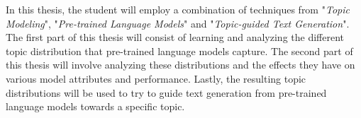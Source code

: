 In this thesis, the student will employ a combination of techniques from "\textit{Topic Modeling}", "\textit{Pre-trained Language Models}" and "\textit{Topic-guided Text Generation}". The first part of this thesis will consist of learning and analyzing the different topic distribution that pre-trained language models capture. The second part of this thesis will involve analyzing these distributions and the effects they have on various model attributes and performance. Lastly, the resulting topic distributions will be used to try to guide text generation from pre-trained language models towards a specific topic. 
